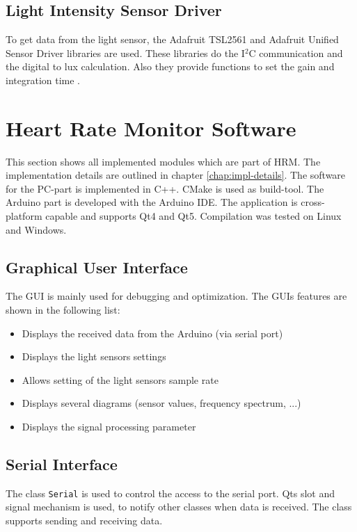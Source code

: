 \documentclass[notitlepage]{scrreprt}
\begin{document}
\subsection{Light Intensity Sensor Driver}
To get data from the light sensor, the Adafruit TSL2561 and Adafruit Unified Sensor Driver libraries are used. These libraries do the I$^{2}$C communication and the digital to lux calculation. Also they provide functions to set the gain and integration time \cite{bib:tsl-library} \cite{bib:sensor-library}.

\newpage

\section{Heart Rate Monitor Software}
This section shows all implemented modules which are part of HRM. The implementation details are outlined in chapter \ref{chap:impl-details}. The software for the PC-part is implemented in C++. CMake is used as build-tool. The Arduino part is developed with the Arduino IDE. The application is cross-platform capable and supports Qt4 and Qt5. Compilation was tested on Linux and Windows.

\subsection{Graphical User Interface}
The GUI is mainly used for debugging and optimization. The GUIs features are shown in the following list:

\begin{itemize}
	\item{Displays the received data from the Arduino (via serial port)}
	\item{Displays the light sensors settings}
	\item{Allows setting of the light sensors sample rate}
	\item{Displays several diagrams (sensor values, frequency spectrum, ...)}
	\item{Displays the signal processing parameter}
\end{itemize}

\subsection{Serial Interface}
The class \lstinline{Serial} is used to control the access to the serial port. Qts slot and signal mechanism is used, to notify other classes when data is received. The class supports sending and receiving data. 
\end{document}
